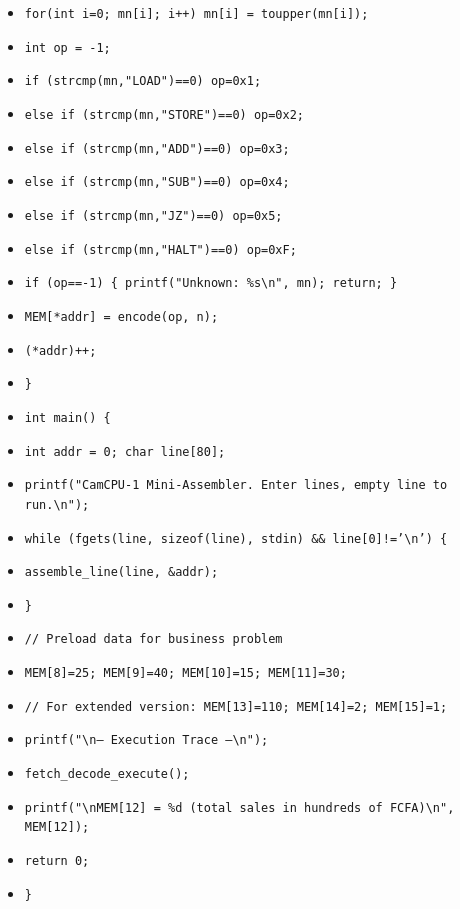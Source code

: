 \documentclass[11pt]{article}
\begin{document}
\begin{exemplebox}
\begin{itemize}
\item \texttt{\quad for(int i=0; mn[i]; i++) mn[i] = toupper(mn[i]);}
\item \texttt{\quad int op = -1;}
\item \texttt{\quad if (strcmp(mn,"LOAD")==0) op=0x1;}
\item \texttt{\quad else if (strcmp(mn,"STORE")==0) op=0x2;}
\item \texttt{\quad else if (strcmp(mn,"ADD")==0) op=0x3;}
\item \texttt{\quad else if (strcmp(mn,"SUB")==0) op=0x4;}
\item \texttt{\quad else if (strcmp(mn,"JZ")==0) op=0x5;}
\item \texttt{\quad else if (strcmp(mn,"HALT")==0) op=0xF;}
\item \texttt{\quad if (op==-1) \{ printf("Unknown: \%s\textbackslash n", mn); return; \}}
\item \texttt{\quad MEM[*addr] = encode(op, n);}
\item \texttt{\quad (*addr)++;}
\item \texttt{\}}
\item \texttt{int main() \{}
\item \texttt{\quad int addr = 0; char line[80];}
\item \texttt{\quad printf("CamCPU-1 Mini-Assembler. Enter lines, empty line to run.\textbackslash n");}
\item \texttt{\quad while (fgets(line, sizeof(line), stdin) \&\& line[0]!='\textbackslash n') \{}
\item \texttt{\quad\quad assemble\_line(line, \&addr);}
\item \texttt{\quad \}}
\item \texttt{\quad // Preload data for business problem}
\item \texttt{\quad MEM[8]=25; MEM[9]=40; MEM[10]=15; MEM[11]=30;}
\item \texttt{\quad // For extended version: MEM[13]=110; MEM[14]=2; MEM[15]=1;}
\item \texttt{\quad printf("\textbackslash n--- Execution Trace ---\textbackslash n");}
\item \texttt{\quad fetch\_decode\_execute();}
\item \texttt{\quad printf("\textbackslash nMEM[12] = \%d (total sales in hundreds of FCFA)\textbackslash n", MEM[12]);}
\item \texttt{\quad return 0;}
\item \texttt{\}}
\end{itemize}
\end{exemplebox}
\end{document}
